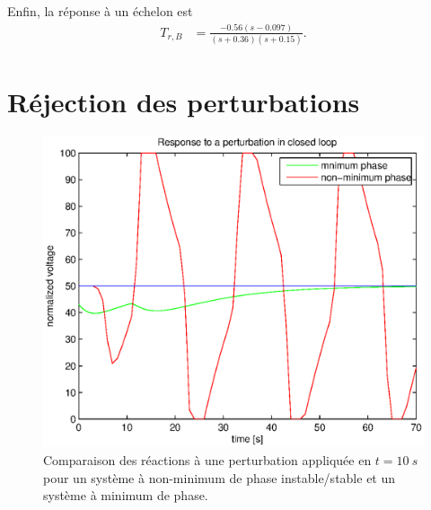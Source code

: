 \documentclass[frenchb, paper=a4, fontsize=11pt]{scrartcl}
\numberwithin{equation}{section}					%
\numberwithin{figure}{section}					%
\numberwithin{table}{section}						%
\begin{document}
Enfin, la réponse à un échelon est
\begin{align*}
T_{r,B} &= \frac{-0.56(s-0.097)}{(s+0.36)(s+0.15)}.
\end{align*}

\section{Réjection des perturbations}

\begin{figure}[ht]
	\centering
	\includegraphics[scale=0.9]{img/pert-rejection-closed-loop.eps}
	\caption{Comparaison des réactions à une perturbation appliquée en
	$t=\SI{10}{s}$ pour un système à non-minimum de phase instable/stable
	et un système à minimum de phase.}
	\label{fig:pert-rej}
\end{figure}
\end{document}

